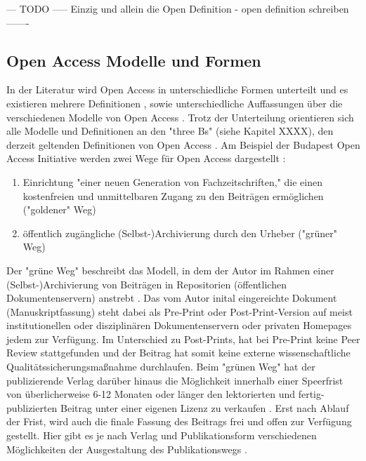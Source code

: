 --- TODO ----- Einzig und allein die Open Definition - open definition schreiben -------

\subsection{Open Access Modelle und Formen}

In der Literatur wird Open Access in unterschiedliche Formen unterteilt und es existieren mehrere Definitionen \cite{CREATe_2014} \cite{albert_2006_open_implications}, sowie unterschiedliche Auffassungen über die verschiedenen Modelle von Open Access \cite{CREATe_2014} \cite{cite:22b} \cite{lewis_2012_inevitability}. Trotz der Unterteilung orientieren sich alle Modelle und Definitionen an den "three Bs" (siehe Kapitel XXXX), den derzeit geltenden Definitionen von Open Access \cite{Adema_2014_open_access}. Am Beispiel der Budapest Open Access Initiative werden zwei Wege für Open Access dargestellt \cite{albert_2006_open_implications}: 
\begin{enumerate}
\item Einrichtung "einer neuen Generation von Fachzeitschriften," die einen kostenfreien und unmittelbaren Zugang zu den Beiträgen ermöglichen ("goldener" Weg)
\item öffentlich zugängliche (Selbst-)Archivierung durch den Urheber ("grüner" Weg)
\end{enumerate}

Der "grüne Weg" beschreibt das Modell, in dem der Autor im Rahmen einer (Selbst-)Archivierung von Beiträgen in Repositorien (öffentlichen Dokumentenservern) anstrebt \cite{suchen}. Das vom Autor inital eingereichte Dokument (Manuskriptfassung) steht dabei als Pre-Print oder Post-Print-Version auf meist institutionellen oder disziplinären Dokumentenservern \cite{suchen} oder privaten Homepages \cite{suchen} jedem zur Verfügung. Im Unterschied zu Post-Prints, hat bei Pre-Print keine Peer Review stattgefunden \cite{suchen} und der Beitrag hat somit keine externe wissenschaftliche Qualitätssicherungsmaßnahme durchlaufen. Beim "grünen Weg" hat der publizierende Verlag darüber hinaus die Möglichkeit innerhalb einer Speerfrist von überlicherweise 6-12 Monaten \cite{suchen} oder länger den lektorierten und fertig-publizierten Beitrag unter einer eigenen Lizenz zu verkaufen \cite{suchen}. Erst nach Ablauf der Frist, wird auch die finale Fassung des Beitrags frei und offen zur Verfügung gestellt. Hier gibt es je nach Verlag und Publikationsform verschiedenen Möglichkeiten der Ausgestaltung des Publikationswegs \cite{suchen}.


